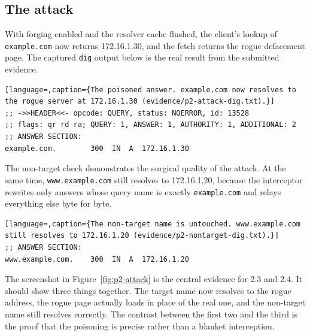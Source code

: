 \documentclass[11pt]{article}
\begin{document}
\subsection{The attack}

With forging enabled and the resolver cache flushed, the client's lookup of
\texttt{example.com} now returns 172.16.1.30, and the fetch returns the rogue
defacement page. The captured \texttt{dig} output below is the real result from
the submitted evidence.

\begin{lstlisting}[language=,caption={The poisoned answer. example.com now resolves to the rogue server at 172.16.1.30 (evidence/p2-attack-dig.txt).}]
;; ->>HEADER<<- opcode: QUERY, status: NOERROR, id: 13528
;; flags: qr rd ra; QUERY: 1, ANSWER: 1, AUTHORITY: 1, ADDITIONAL: 2
;; ANSWER SECTION:
example.com.        300  IN  A  172.16.1.30
\end{lstlisting}

The non-target check demonstrates the surgical quality of the attack. At the same
time, \texttt{www.example.com} still resolves to 172.16.1.20, because the
interceptor rewrites only answers whose query name is exactly \texttt{example.com}
and relays everything else byte for byte.

\begin{lstlisting}[language=,caption={The non-target name is untouched. www.example.com still resolves to 172.16.1.20 (evidence/p2-nontarget-dig.txt).}]
;; ANSWER SECTION:
www.example.com.    300  IN  A  172.16.1.20
\end{lstlisting}


The screenshot in Figure~\ref{fig:p2-attack} is the central evidence for 2.3 and
2.4. It should show three things together. The target name now resolves to the
rogue address, the rogue page actually loads in place of the real one, and the
non-target name still resolves correctly. The contrast between the first two and
the third is the proof that the poisoning is precise rather than a blanket
interception.

\end{document}
